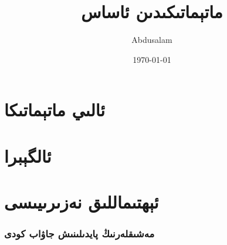 \documentclass[a4paper,openany,12pt]{book}
\title{ماتېماتىكىدىن ئاساس}
\author{Abdusalam}
\date{\today}
\begin{document}
%

\newpage


\newpage
\setcounter{page}{1}
\part{ئالىي ماتېماتىكا}
\newcommand\yfx{$y=f(x)$}


\newpage

\newpage

\newpage

\newpage

\newpage

\newpage

\newpage

\part{ئالگېبرا}
\newpage

\newpage

\newpage


\part{ئېھتىماللىق نەزىرىيىسى}

%
%
%


\newpage
\section*{مەشىقلەرنىڭ پايدىلىنىش جاۋاب كودى}

\newpage
%



\end{document}
